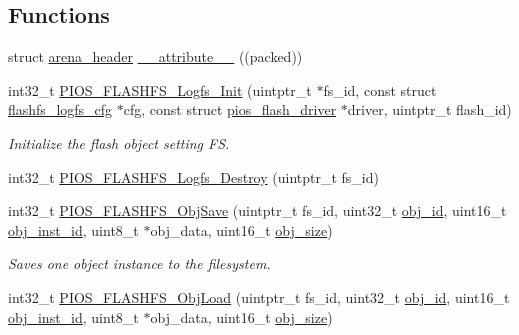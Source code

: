 \subsection*{\-Functions}
\begin{DoxyCompactItemize}
\item 
struct \hyperlink{structarena__header}{arena\-\_\-header} \hyperlink{group___p_i_o_s___f_l_a_s_h_f_s_gaf0823c3e99bb9ab51cfc8a807339ad1b}{\-\_\-\-\_\-attribute\-\_\-\-\_\-} ((packed))
\item 
int32\-\_\-t \hyperlink{group___p_i_o_s___f_l_a_s_h_f_s_ga2597ca18b2f818f6b2aee1e29cc661e2}{\-P\-I\-O\-S\-\_\-\-F\-L\-A\-S\-H\-F\-S\-\_\-\-Logfs\-\_\-\-Init} (uintptr\-\_\-t $\ast$fs\-\_\-id, const struct \hyperlink{structflashfs__logfs__cfg}{flashfs\-\_\-logfs\-\_\-cfg} $\ast$cfg, const struct \hyperlink{structpios__flash__driver}{pios\-\_\-flash\-\_\-driver} $\ast$driver, uintptr\-\_\-t flash\-\_\-id)
\begin{DoxyCompactList}\small\item\em \-Initialize the flash object setting \-F\-S. \end{DoxyCompactList}\item 
int32\-\_\-t \hyperlink{group___p_i_o_s___f_l_a_s_h_f_s_ga2fdf3f16270fb9c7f85a4c7a9bfce2ce}{\-P\-I\-O\-S\-\_\-\-F\-L\-A\-S\-H\-F\-S\-\_\-\-Logfs\-\_\-\-Destroy} (uintptr\-\_\-t fs\-\_\-id)
\item 
int32\-\_\-t \hyperlink{group___p_i_o_s___f_l_a_s_h_f_s_ga2566e681162e422c1457f10146eda492}{\-P\-I\-O\-S\-\_\-\-F\-L\-A\-S\-H\-F\-S\-\_\-\-Obj\-Save} (uintptr\-\_\-t fs\-\_\-id, uint32\-\_\-t \hyperlink{pios__flashfs__logfs_8c_a4901f00431a2c948153bd4f187fce556}{obj\-\_\-id}, uint16\-\_\-t \hyperlink{pios__flashfs__logfs_8c_a7930e82075aa4e3326ad9615090b5d61}{obj\-\_\-inst\-\_\-id}, uint8\-\_\-t $\ast$obj\-\_\-data, uint16\-\_\-t \hyperlink{pios__flashfs__logfs_8c_acd6c9a9729f524a58be43afcb2d0782a}{obj\-\_\-size})
\begin{DoxyCompactList}\small\item\em \-Saves one object instance to the filesystem. \end{DoxyCompactList}\item 
int32\-\_\-t \hyperlink{group___p_i_o_s___f_l_a_s_h_f_s_ga159a3e2681cd03a6512dd59348c8a764}{\-P\-I\-O\-S\-\_\-\-F\-L\-A\-S\-H\-F\-S\-\_\-\-Obj\-Load} (uintptr\-\_\-t fs\-\_\-id, uint32\-\_\-t \hyperlink{pios__flashfs__logfs_8c_a4901f00431a2c948153bd4f187fce556}{obj\-\_\-id}, uint16\-\_\-t \hyperlink{pios__flashfs__logfs_8c_a7930e82075aa4e3326ad9615090b5d61}{obj\-\_\-inst\-\_\-id}, uint8\-\_\-t $\ast$obj\-\_\-data, uint16\-\_\-t \hyperlink{pios__flashfs__logfs_8c_acd6c9a9729f524a58be43afcb2d0782a}{obj\-\_\-size})

\end{DoxyCompactItemize}
